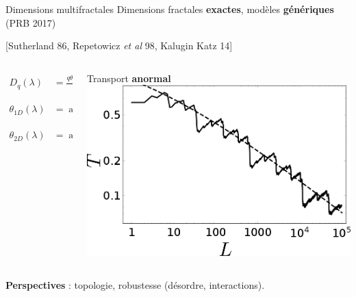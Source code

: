 \begin{frame}{Dimensions multifractales}
Dimensions fractales \textbf{exactes}, modèles \textbf{génériques} (PRB 2017)

\hfill {\footnotesize[Sutherland 86, Repetowicz \emph{et al} 98, Kalugin Katz 14]}

\begin{columns}
	\begin{column}{0.5\textwidth}
		\begin{align*}
			D_q(\lambda) &= \frac{q \theta(\lambda) - \theta(\lambda^q))}{(q-1)\theta(1)} \\
			\theta_{1D}(\lambda) &= \arcsin\left(\frac{(\lambda + \lambda^{-1})^2}{2}\right) \\
			\theta_{2D}(\lambda) &= \arccos(4\lambda + 9 + 4\lambda^{-1})
		\end{align*}
	\end{column}
	\begin{column}{0.5\textwidth}
		Transport \textbf{anormal}
		\centering
		\includegraphics[width=0.9\columnwidth]{img/1_travaux/transport}
	\end{column}
\end{columns}

\textbf{Perspectives} : topologie, robustesse (désordre, interactions).
\end{frame}

